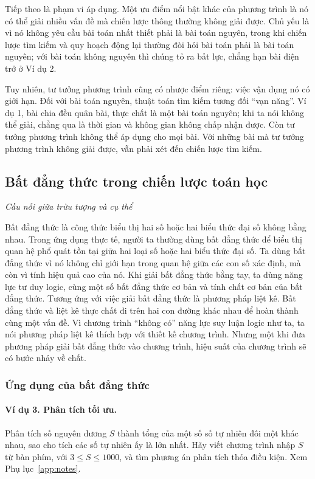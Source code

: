 \documentclass[11pt]{article}
\begin{document}
Tiếp theo là phạm vi áp dụng. Một ưu điểm nổi bật khác của phương trình là nó
có thể giải nhiều vấn đề mà chiến lược thông thường không giải được. Chủ yếu
là vì nó không yêu cầu bài toán nhất thiết phải là bài toán nguyên, trong khi
chiến lược tìm kiếm và quy hoạch động lại thường đòi hỏi bài toán phải là bài
toán nguyên; với bài toán không nguyên thì chúng tỏ ra bất lực, chẳng hạn bài
điện trở ở Ví dụ 2.

Tuy nhiên, tư tưởng phương trình cũng có nhược điểm riêng: việc vận dụng nó
có giới hạn. Đối với bài toán nguyên, thuật toán tìm kiếm tương đối ``vạn
năng''. Ví dụ 1, bài chia đều quân bài, thực chất là một bài toán nguyên; khi
ta nói không thể giải, chẳng qua là thời gian và không gian không chấp nhận
được. Còn tư tưởng phương trình không thể áp dụng cho mọi bài. Với những bài
mà tư tưởng phương trình không giải được, vẫn phải xét đến chiến lược tìm
kiếm.

\subsection{Bất đẳng thức trong chiến lược toán học}

\begin{center}
\textit{Cầu nối giữa trừu tượng và cụ thể}
\end{center}

Bất đẳng thức là công thức biểu thị hai số hoặc hai biểu thức đại số không
bằng nhau. Trong ứng dụng thực tế, người ta thường dùng bất đẳng thức để biểu
thị quan hệ phổ quát tồn tại giữa hai loại số hoặc hai biểu thức đại số. Ta
dùng bất đẳng thức vì nó không chỉ giới hạn trong quan hệ giữa các con số xác
định, mà còn vì tính hiệu quả cao của nó. Khi giải bất đẳng thức bằng tay, ta
dùng năng lực tư duy logic, cùng một số bất đẳng thức cơ bản và tính chất cơ
bản của bất đẳng thức. Tương ứng với việc giải bất đẳng thức là phương pháp
liệt kê. Bất đẳng thức và liệt kê thực chất đi trên hai con đường khác nhau
để hoàn thành cùng một vấn đề. Vì chương trình ``không có'' năng lực suy luận
logic như ta, ta nói phương pháp liệt kê thích hợp với thiết kế chương trình.
Nhưng một khi đưa phương pháp giải bất đẳng thức vào chương trình, hiệu suất
của chương trình sẽ có bước nhảy về chất.

\subsubsection{Ứng dụng của bất đẳng thức}

\paragraph{Ví dụ 3. Phân tích tối ưu.}
Phân tích số nguyên dương \(S\) thành tổng của một số số tự nhiên đôi một khác
nhau, sao cho tích các số tự nhiên ấy là lớn nhất. Hãy viết chương trình nhập
\(S\) từ bàn phím, với \(3\le S\le1000\), và tìm phương án phân tích thỏa
điều kiện. Xem Phụ lục~\ref{app:notes}.
\end{document}
